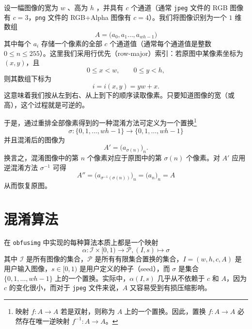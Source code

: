 \documentclass[12pt, a4paper, twoside]{article}
\begin{document}
设一幅图像的宽为 $w$ \si{\pixel}、高为 $h$ \si{\pixel}，并具有 $c$ 个通道（通常 \texttt{jpeg} 文件的 RGB 图像有 $c = 3$，\texttt{png} 文件的 RGB+Alpha 图像有 $c = 4$）。我们将图像识别为一个 $1$ 维数组
\begin{equation}
    A = \bigl(a_0, a_1 \ldots, a_{w h - 1}\bigr)
\end{equation}
其中每个 $a_i$ 存储一个像素的全部 $c$ 个通道值（通常每个通道值是整数 $0 \leq n \leq 255$）。这里我们采用行优先（row-major）索引：若原图中某像素坐标为 $(x, y)$，且
\begin{equation}
    0 \leq x < w, \qquad 0 \leq y < h,
\end{equation}
则其数组下标为
\begin{equation}
    i = i(x, y) = y w + x.
\end{equation}
这意味着我们按从左到右、从上到下的顺序读取像素。只要知道图像的宽（或高），这个过程就是可逆的。

于是，通过重排全部像素得到的一种混淆方法可定义为一个置换\footnote{映射 $f\colon A \to A$ 若是双射，则称为 $A$ 上的一个置换。因此，置换 $f\colon A \to A$ 必然存在唯一逆映射 $f^{-1}\colon A \to A$。}
\begin{equation}
    \sigma\colon \{0, 1, \ldots, w h - 1 \} \to \{0, 1, \ldots, w h - 1 \}
\end{equation}
并且混淆后的图像为
\begin{equation}
    A' = \bigl(a_{\sigma(n)}\bigr)_n.
\end{equation}
换言之，混淆图像中的第 $n$ 个像素对应于原图中的第 $\sigma(n)$ 个像素。对 $A'$ 应用逆混淆方法 $\sigma^{-1}$ 可得
\begin{equation}
    A'' = \bigl(a_{\sigma^{-1}(\sigma(n))}\bigr)_n = \bigl(a_{n}\bigr)_n = A
\end{equation}
从而恢复原图。

\section{混淆算法}

在 \texttt{obfusimg} 中实现的每种算法本质上都是一个映射
\begin{equation}
    \alpha\colon \mathcal{I} \times [0, 1) \to \mathcal{P}, (I, s) \mapsto \sigma
\end{equation}
其中 $\mathcal{I}$ 是所有图像的集合，$\mathcal{P}$ 是所有有限集合置换的集合，$I = (w, h, c, A)$ 是用户输入图像，$s \in [0, 1)$ 是用户定义的种子（seed），而 $\sigma$ 是集合 $\{0, 1, \ldots, w h - 1\}$ 上的一个置换。实际中，$\alpha(I, s)$ 几乎从不依赖于 $c$ 和 $A$，因为 $c$ 的变化很小，而对于 \texttt{jpeg} 文件来说，$A$ 又容易受到有损压缩影响。
\end{document}

